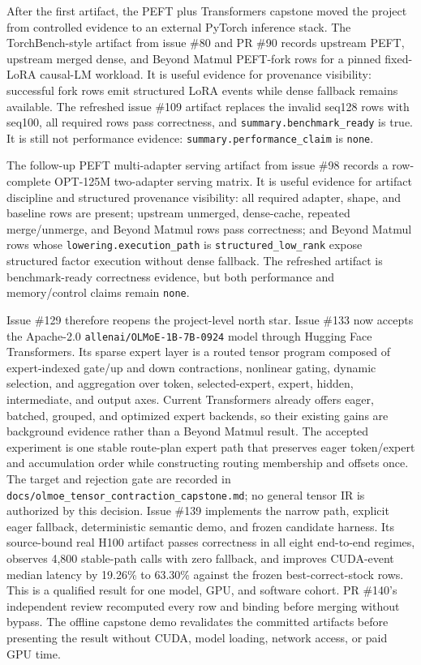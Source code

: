 \documentclass[11pt]{article}
\begin{document}
After the first artifact, the PEFT plus Transformers capstone moved the project
from controlled evidence to an external PyTorch inference stack. The
TorchBench-style artifact from issue \#80 and PR \#90 records upstream PEFT,
upstream merged dense, and Beyond Matmul PEFT-fork rows for a pinned
fixed-LoRA causal-LM workload. It is useful evidence for provenance visibility:
successful fork rows emit structured LoRA events while dense fallback remains
available. The refreshed issue \#109 artifact replaces the invalid seq128 rows
with seq100, all required rows pass correctness, and
\texttt{summary.benchmark\_ready} is true. It is still not performance
evidence: \texttt{summary.performance\_claim} is \texttt{none}.

The follow-up PEFT multi-adapter serving artifact from issue \#98 records a
row-complete OPT-125M two-adapter serving matrix. It is useful evidence for
artifact discipline and structured provenance visibility: all required
adapter, shape, and baseline rows are present; upstream unmerged, dense-cache,
repeated merge/unmerge, and Beyond Matmul rows pass correctness; and Beyond
Matmul rows whose \texttt{lowering.execution\_path} is
\texttt{structured\_low\_rank} expose structured factor execution without
dense fallback. The refreshed artifact is benchmark-ready correctness
evidence, but both
performance and memory/control claims remain \texttt{none}.

Issue \#129 therefore reopens the project-level north star. Issue \#133 now
accepts the Apache-2.0 \texttt{allenai/OLMoE-1B-7B-0924} model through Hugging
Face Transformers. Its sparse expert layer is a routed tensor program composed
of expert-indexed gate/up and down contractions, nonlinear gating, dynamic
selection, and aggregation over token, selected-expert, expert, hidden,
intermediate, and output axes. Current Transformers already offers eager,
batched, grouped, and optimized expert backends, so their existing gains are
background evidence rather than a Beyond Matmul result. The accepted experiment
is one stable route-plan expert path that preserves eager token/expert and
accumulation order while constructing routing membership and offsets once. The
target and rejection gate are recorded in
\texttt{docs/olmoe\_tensor\_contraction\_capstone.md}; no general tensor IR is
authorized by this decision. Issue \#139 implements the narrow path, explicit
eager fallback, deterministic semantic demo, and frozen candidate harness. Its
source-bound real H100 artifact passes correctness in all eight end-to-end
regimes, observes 4,800 stable-path calls with zero fallback, and improves
CUDA-event median latency by 19.26\% to 63.30\% against the frozen
best-correct-stock rows. This is a qualified result for one model, GPU, and
software cohort. PR \#140's independent review recomputed every row and binding
before merging without bypass. The offline capstone demo revalidates the
committed artifacts before presenting the result without CUDA, model loading,
network access, or paid GPU time.
\end{document}
